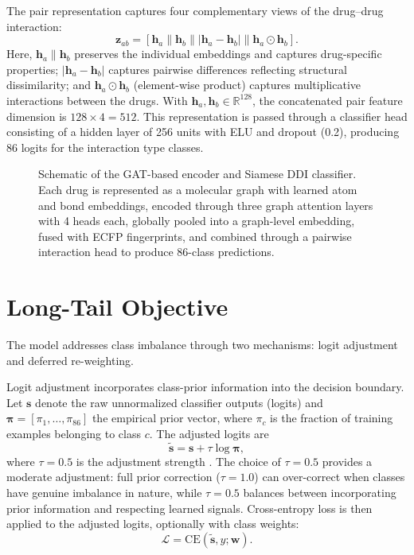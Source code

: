 \documentclass[11pt,a4paper]{report}
\begin{document}
The pair representation captures four complementary views of the drug--drug interaction:
\begin{equation}
\mathbf{z}_{ab} =
[\mathbf{h}_a \| \mathbf{h}_b \| |\mathbf{h}_a - \mathbf{h}_b| \| \mathbf{h}_a \odot \mathbf{h}_b].
\end{equation}
Here, \(\mathbf{h}_a \| \mathbf{h}_b\) preserves the individual embeddings and captures drug-specific properties; \(|\mathbf{h}_a - \mathbf{h}_b|\) captures pairwise differences reflecting structural dissimilarity; and \(\mathbf{h}_a \odot \mathbf{h}_b\) (element-wise product) captures multiplicative interactions between the drugs. With \(\mathbf{h}_a, \mathbf{h}_b \in \mathbb{R}^{128}\), the concatenated pair feature dimension is \(128 \times 4 = 512\). This representation is passed through a classifier head consisting of a hidden layer of 256 units with ELU and dropout (0.2), producing 86 logits for the interaction type classes.

\begin{figure}[H]
\centering
{}
\caption{Schematic of the GAT-based encoder and Siamese DDI classifier. Each drug is represented as a molecular graph with learned atom and bond embeddings, encoded through three graph attention layers with 4 heads each, globally pooled into a graph-level embedding, fused with ECFP fingerprints, and combined through a pairwise interaction head to produce 86-class predictions.}
\label{fig:gat_architecture}
\end{figure}
\section{Long-Tail Objective}
The model addresses class imbalance through two mechanisms: logit adjustment and deferred re-weighting.

Logit adjustment incorporates class-prior information into the decision boundary. Let \(\mathbf{s}\) denote the raw unnormalized classifier outputs (logits) and \(\boldsymbol{\pi} = [\pi_1, \ldots, \pi_{86}]\) the empirical prior vector, where \(\pi_c\) is the fraction of training examples belonging to class \(c\). The adjusted logits are
\begin{equation}
\tilde{\mathbf{s}} = \mathbf{s} + \tau \log \boldsymbol{\pi},
\end{equation}
where \(\tau = 0.5\) is the adjustment strength \cite{menon2021logit}. The choice of \(\tau = 0.5\) provides a moderate adjustment: full prior correction (\(\tau = 1.0\)) can over-correct when classes have genuine imbalance in nature, while \(\tau = 0.5\) balances between incorporating prior information and respecting learned signals. Cross-entropy loss is then applied to the adjusted logits, optionally with class weights:
\begin{equation}
\mathcal{L} = \mathrm{CE}(\tilde{\mathbf{s}}, y; \mathbf{w}).
\end{equation}
\end{document}
